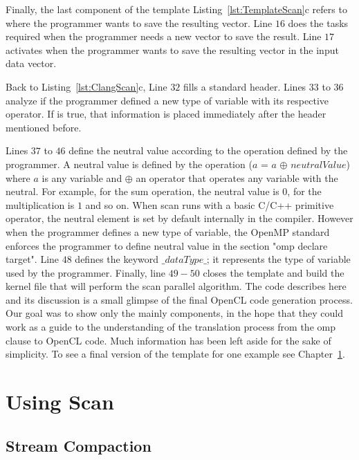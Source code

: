 \documentclass[Ingles]{ic-tese-v1}
\newcommand{\rcap}[1]{Chapter~\ref{cap:#1}}
\newcommand{\rlst}[1]{Listing~\ref{lst:#1}}
\begin{document}
Finally, the last component of the template \rlst{TemplateScan}{c} refers to
where the programmer wants to save the resulting vector. Line $16$ does the  tasks
required  when the programmer needs a new vector to save the result. Line $17$ activates when
the programmer wants to save the resulting vector in the input data vector.

Back to \rlst{ClangScan}{c}, Line $32$ fills a standard header. Lines $33$
to $36$ analyze if the programmer defined a new type of variable with its
respective operator. If is true, that information is placed immediately after
the header mentioned before.

Lines $37$ to $46$ define the neutral value according to the operation defined
by the programmer.  A neutral value is defined by the operation ($a$ = $a$
$\oplus$ $neutralValue$) where $a$ is any variable and $\oplus$ an operator
that operates any variable with the neutral. For example, for the sum
operation, the neutral value is $0$, for the multiplication is $1$ and so on.
When scan runs  with a basic C/C++ primitive  operator, the neutral  element is
set by default internally in the compiler. However when the programmer defines
a new type of variable, the OpenMP standard enforces the programmer  to define
neutral value in the section "omp declare target".  Line $48$ defines the
keyword $\_dataType\_$; it represents the type of variable used by the
programmer. Finally, line $49-50$ closes the template and build the kernel file
that will perform the scan parallel algorithm. The code describes here and its
discussion is a small glimpse of the final OpenCL code generation process. Our
goal was to show only the mainly components, in the hope that they could work
as a guide to the understanding of the translation process from the omp clause
to OpenCL code. Much information has been left aside for the sake of
simplicity.
To see a final version of the template for one example see \rcap{ScanUse}.

\chapter{Using Scan}
\label{cap:ScanUse}

\section{Stream Compaction}
\end{document}
